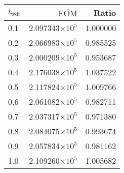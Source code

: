 \begin{tabular}{lrr}
\toprule
$t_{\mathrm{wdt}}$ & $\overline{\mathrm{FOM}}$ &    Ratio \\
\midrule
               0.1 &   2.097343$\times 10^{5}$ & 1.000000 \\
               0.2 &   2.066983$\times 10^{5}$ & 0.985525 \\
               0.3 &   2.000209$\times 10^{5}$ & 0.953687 \\
               0.4 &   2.176038$\times 10^{5}$ & 1.037522 \\
               0.5 &   2.117824$\times 10^{5}$ & 1.009766 \\
               0.6 &   2.061082$\times 10^{5}$ & 0.982711 \\
               0.7 &   2.037317$\times 10^{5}$ & 0.971380 \\
               0.8 &   2.084075$\times 10^{5}$ & 0.993674 \\
               0.9 &   2.057834$\times 10^{5}$ & 0.981162 \\
               1.0 &   2.109260$\times 10^{5}$ & 1.005682 \\
\bottomrule
\end{tabular}
